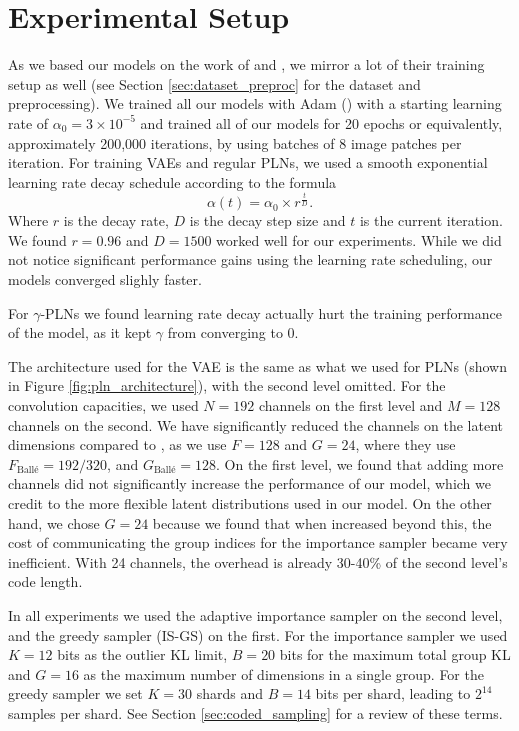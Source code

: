 \section{Experimental Setup}
\par
As we based our models on the work of \cite{balle2016end} and
\cite{balle2018variational}, we mirror a lot of their training setup as well
(see Section \ref{sec:dataset_preproc} for the dataset and preprocessing). We
trained all our models with Adam (\cite{kingma2014adam}) with a starting
learning rate of $\alpha_0 =
3 \times 10^{-5}$ and trained all of our models for 20 epochs or equivalently,
approximately 200,000 iterations, by using batches of 8 image patches per
iteration. For training VAEs and regular PLNs, we used a smooth
exponential learning rate decay schedule according to the formula
\[
  \alpha(t) = \alpha_0 \times r^{\frac{t}{D}}.
\]
Where $r$ is the decay rate, $D$ is the decay step size and $t$ is the current
iteration. We found $r = 0.96$ and $D = 1500$ worked well for our
experiments. While we did not notice significant performance gains using the
learning rate scheduling, our models converged slighly faster.
\par
For $\gamma$-PLNs we found learning rate decay actually hurt the training
performance of the model, as it kept $\gamma$ from converging to 0.
\par
The architecture used for the VAE is the same as what we used for PLNs (shown in
Figure \ref{fig:pln_architecture}), with the second level omitted. For the
convolution capacities, we used $N = 192$ channels on the first
level and $M = 128$ channels on the second. We have significantly reduced the
channels on the latent dimensions compared to \cite{balle2018variational}, as we
use $F = 128$ and $G = 24$, where they use $F_{\text{Ball\'e}} = 192 / 320$, and
$G_{\text{Ball\'e}} = 128$. On the first level, we found that adding more
channels did not significantly increase the performance of our model, which we
credit to the more flexible latent distributions used in our model. On the other
hand, we chose $G = 24$ because we found that when increased beyond this, the
cost of communicating the group indices for the importance sampler became very
inefficient. With 24 channels, the overhead is already 30-40\% of the second
level's code length.
\par
In all experiments we used the adaptive importance sampler on the second level, and the
greedy sampler (IS-GS) on the first. For the importance sampler we used $K = 12$
bits as the outlier KL limit, $B = 20$ bits for the maximum total group KL and
$G = 16$ as the maximum number of dimensions in a single group. For the greedy
sampler we set $K = 30$ shards and $B = 14$ bits per shard, leading to $2^{14}$
samples per shard. See Section \ref{sec:coded_sampling} for a review of these terms.

